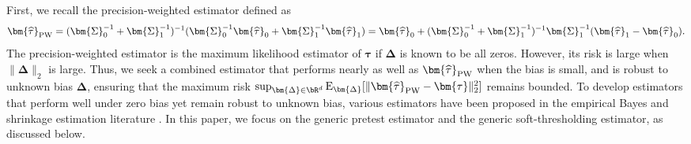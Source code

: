 \documentclass[11pt]{article}
\def\E{{\mathrm E}}
\newcommand{\htau}{\widehat\tau}
\numberwithin{equation}{section}
\theoremstyle{definition}
\begin{document}
First, we recall the precision-weighted estimator defined as
\[
  \bm{\htau}_{\rm PW} = (\bm{\Sigma}_0^{-1} + \bm{\Sigma}_1^{-1})^{-1}(\bm{\Sigma}_0^{-1} \bm{\htau}_0 + \bm{\Sigma}_1^{-1} \bm{\htau}_1) = \bm{\htau}_0 + (\bm{\Sigma}_0^{-1} + \bm{\Sigma}_1^{-1})^{-1} \bm{\Sigma}_1^{-1} (\bm{\htau}_1 - \bm{\htau}_0).
\]
The precision-weighted estimator is the maximum likelihood estimator of $\bm{\tau}$ if $\bm{\Delta}$ is known to be all zeros. However, its risk is large when $\lVert \bm{\Delta} \rVert_2$ is large. 
Thus, we seek a combined estimator that performs nearly as well as $\bm{\htau}_{\rm PW}$ when the bias is small, and is robust to unknown bias $\bm{\Delta}$, ensuring that the maximum risk $\sup_{\bm{\Delta} \in \bR^d} \E_{\bm{\Delta}}[\lVert \bm{\htau}_{\rm PW} - \bm{\tau} \rVert_2^2]$ remains bounded. To develop estimators that perform well under zero bias yet remain robust to unknown bias, various estimators have been proposed in the empirical Bayes and shrinkage estimation literature \citep{j1981estimation,bickel1984parametric,green1991james,green2005improved,rosenman2023combining,rosenman2023empirical}. In this paper, we focus on the generic pretest estimator and the generic soft-thresholding estimator, as discussed below.
\end{document}
